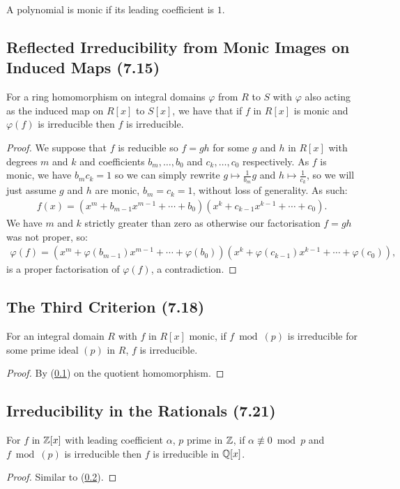 A polynomial is monic if its leading coefficient is $1$.

\subsection{Reflected Irreducibility from Monic Images on Induced Maps (7.15)} \label{7.15}

For a ring homomorphism on integral domains $\varphi$ from $R$ to $S$ with $\varphi$ also
acting as the induced map on $R[x]$ to $S[x]$, we have that if $f$ in $R[x]$ is monic
and $\varphi(f)$ is irreducible then $f$ is irreducible.

\begin{proof}
    We suppose that $f$ is reducible so $f = gh$ for some $g$ and $h$ in $R[x]$ with
    degrees $m$ and $k$ and coefficients $b_m, \ldots, b_0$ and $c_k, \ldots, c_0$
    respectively. As $f$ is monic, we have $b_mc_k = 1$ so we can simply rewrite
    $g \mapsto \frac{1}{b_m}g$ and $h \mapsto \frac{1}{c_k}$, so we will just assume
    $g$ and $h$ are monic, $b_m = c_k = 1$, without loss of generality. As such:
    \begin{align*}
        f(x) = (x^m + b_{m - 1}x^{m - 1} + \cdots + b_0)
            (x^k + c_{k - 1}x^{k - 1} + \cdots + c_0).
    \end{align*} We have $m$ and $k$ strictly greater than zero as otherwise our
    factorisation $f = gh$ was not proper, so: \begin{align*}
        \varphi(f) = (x^m + \varphi(b_{m - 1})x^{m - 1} + \cdots + \varphi(b_0))
            (x^k + \varphi(c_{k - 1})x^{k - 1} + \cdots + \varphi(c_0)),
    \end{align*} is a proper factorisation of $\varphi(f)$, a contradiction.
\end{proof}

\subsection{The Third Criterion (7.18)} \label{7.18}

For an integral domain $R$ with $f$ in $R[x]$ monic, if $f \bmod (p)$
is irreducible for some prime ideal $(p)$ in $R$, $f$ is irreducible.

\begin{proof}
    By (\ref{7.15}) on the quotient homomorphism.
\end{proof}

\subsection{Irreducibility in the Rationals (7.21)} \label{7.21}

For $f$ in $\mathbb{Z}[x]$ with leading coefficient $\alpha$, 
$p$ prime in $\mathbb{Z}$, if $\alpha \not\equiv 0 \bmod p$ and
$f \bmod (p)$ is irreducible then $f$ is irreducible in $\mathbb{Q}[x]$. 

\begin{proof}
    Similar to (\ref{7.18}).
\end{proof}
